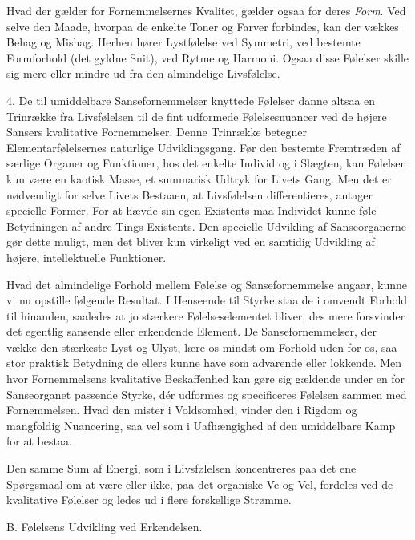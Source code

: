 \documentclass[12pt,a4paper,openany]{book}
\newcommand{\opage}[1]{\marginnote{\footnotesize\textit{[#1]}}}
\begin{document}
Hvad der gælder for Fornemmelsernes Kvalitet, gælder ogsaa for deres
\emph{Form}. Ved selve den Maade, hvorpaa de enkelte Toner og Farver
forbindes, kan der vækkes Behag og Mishag. Herhen hører Lystfølelse ved
Symmetri, ved bestemte Formforhold (det gyldne Snit), ved Rytme og
Harmoni. Ogsaa disse Følelser skille sig mere eller mindre ud fra den
almindelige Livsfølelse.

4. De til umiddelbare Sansefornemmelser knyttede Følelser danne altsaa
en Trinrække fra Livsfølelsen til de fint udformede Følelsesnuancer ved
de højere Sansers kvalitative Fornemmelser. Denne Trinrække betegner
Elementarfølelsernes naturlige Udviklingsgang. Før den bestemte
Fremtræden af særlige Organer og Funktioner, hos det enkelte Individ og
i Slægten, kan Følelsen kun være en kaotisk Masse, et summarisk Udtryk
for Livets Gang. Men det er nødvendigt for selve Livets Bestaaen, at
Livsfølelsen differentieres, antager specielle Former. For at hævde sin
egen Existents maa Individet kunne føle Betydningen af andre Tings
Existents. Den specielle Udvikling af Sanseorganerne gør dette muligt,
men det bliver kun virkeligt ved en samtidig Udvikling af højere,
intellektuelle Funktioner.

Hvad det almindelige Forhold mellem Følelse og Sansefornemmelse angaar,
kunne vi nu opstille følgende Resultat. I Henseende til Styrke staa de i
omvendt Forhold til hinanden, saaledes at jo stærkere Følelseselementet
bliver, des mere forsvinder det egentlig sansende eller erkendende
Element. De Sansefornemmelser, der vække den stærkeste Lyst og Ulyst,
lære os mindst om Forhold uden for os, saa stor praktisk Betydning de
ellers kunne have som advarende eller
\opage{281}lokkende. Men hvor Fornemmelsens kvalitative Beskaffenhed kan
gøre sig gældende under en for Sanseorganet passende Styrke, dér
udformes og specificeres Følelsen sammen med Fornemmelsen. Hvad den
mister i Voldsomhed, vinder den i Rigdom og mangfoldig Nuancering, saa
vel som i Uafhængighed af den umiddelbare Kamp for at bestaa.

Den samme Sum af Energi, som i Livsfølelsen koncentreres paa det ene
Spørgsmaal om at være eller ikke, paa det organiske Ve og Vel, fordeles
ved de kvalitative Følelser og ledes ud i flere forskellige Strømme.

\begin{center}B. Følelsens Udvikling ved Erkendelsen.\end{center}
\end{document}
